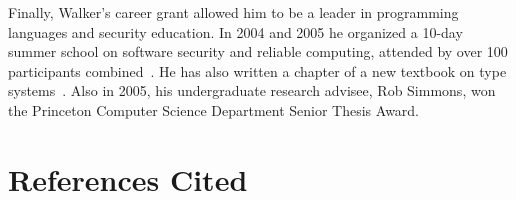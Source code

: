 \documentclass[11pt]{article}
\begin{document}
Finally, Walker's career grant allowed him to be a leader in
programming languages and security education. In 2004 and 2005 he organized
a 10-day summer school on software security and reliable computing,
attended by over 100 participants combined~\cite{summerschool04,summerschool05}.  He has also written a
chapter of a new textbook on type systems~\cite{walker:attapl}.  Also in 2005, his
undergraduate research advisee, Rob Simmons, won the Princeton Computer Science Department
Senior Thesis Award.



\newpage
\section{References Cited}

{

}
\end{document}
